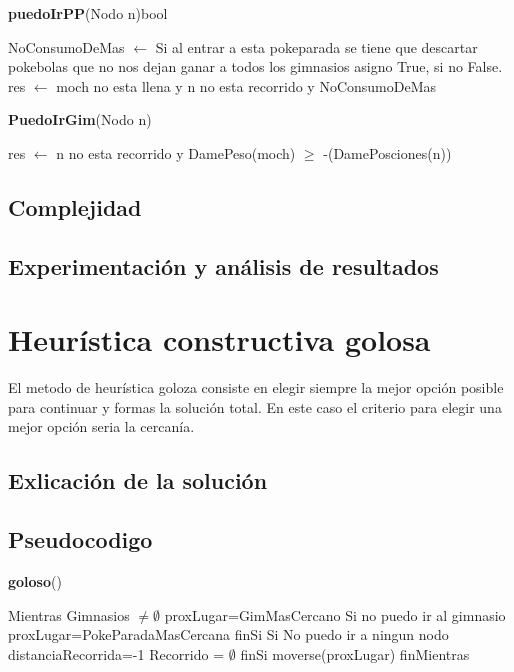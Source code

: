 \documentclass[spanish,12pt]{article}
\begin{document}
\begin{algorithm}[H]{\textbf{puedoIrPP}(Nodo n){bool}}
	\begin{algorithmic}[1]
	\State NoConsumoDeMas $\gets$ Si al entrar a esta pokeparada se tiene que descartar pokebolas que no nos dejan ganar a todos los gimnasios asigno True, si no False.
	\State  res $\gets$  moch no esta llena y n no esta recorrido y NoConsumoDeMas
	\end{algorithmic}
\end{algorithm}

\begin{algorithm}[H]{\textbf{PuedoIrGim}(Nodo n)}
	\begin{algorithmic}[1]
		\state res $\gets$  n no esta recorrido y DamePeso(moch) $\geq$ -(DamePosciones(n))
	\end{algorithmic}
\end{algorithm}


\subsection{Complejidad}

\subsection{Experimentación y análisis de resultados}



\section{Heurística constructiva golosa}

El metodo de heurística goloza consiste en elegir siempre la mejor opción posible para continuar y formas la solución total. En este caso el criterio para elegir una mejor opción seria la cercanía.


\subsection{Exlicación de la solución}



\subsection{Pseudocodigo}

\begin{algorithm}[H]{\textbf{goloso}()}
	\begin{algorithmic}[1]
		\State Mientras Gimnasios $\not= \emptyset$
		\State \quad proxLugar=GimMasCercano
		\State \quad Si no puedo ir al gimnasio
		\State \qquad proxLugar=PokeParadaMasCercana
		\State \quad finSi
		\State \quad Si No puedo ir a ningun nodo 
		\State \qquad distanciaRecorrida=-1
		\State \qquad Recorrido = $\emptyset$
		\State \quad finSi
		\State \quad moverse(proxLugar)
		\State finMientras
	\end{algorithmic}
\end{algorithm}
\end{document}
